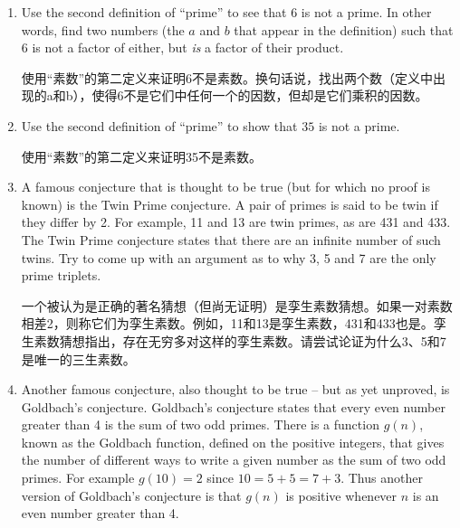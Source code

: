 \begin{enumerate}
  \item Use the second definition of ``prime'' to see that $6$ is
  not a prime.
  In other words, find two numbers (the $a$ and $b$ 
  that appear in the definition) such that $6$ is not a factor of
  either, but {\em is} a factor of their product.
  
  使用“素数”的第二定义来证明6不是素数。换句话说，找出两个数（定义中出现的a和b），使得6不是它们中任何一个的因数，但却是它们乘积的因数。
  \wbvfill
  
  
  \item Use the second definition of ``prime'' to show that $35$ is
  not a prime.
  
  使用“素数”的第二定义来证明35不是素数。
  \wbvfill
  
  
  \workbookpagebreak
  
  \item A famous conjecture that is thought to be true (but
  for which no proof is known) is the  
  Twin Prime conjecture.
  A pair of primes is said to be twin if they differ by 2.
  For example, 11 and 13 are twin primes, as are 431 and 433.
  The Twin Prime conjecture states that there are an infinite
  number of such twins.
  Try to come up with an argument as
  to why 3, 5 and 7 are the only prime triplets.
  
  一个被认为是正确的著名猜想（但尚无证明）是孪生素数猜想。如果一对素数相差2，则称它们为孪生素数。例如，11和13是孪生素数，431和433也是。孪生素数猜想指出，存在无穷多对这样的孪生素数。请尝试论证为什么3、5和7是唯一的三生素数。
  \wbvfill
  
  
  
  
  \item Another famous conjecture, also thought to be true -- but
  as yet unproved, is 
  Goldbach's conjecture.
  Goldbach's conjecture
  states that every even number greater than 4 is the sum of two odd
  primes.
  There is a function $g(n)$, known as the Goldbach function, defined
  on the positive integers, that gives the number of different ways to 
  write a given number as the sum of two odd primes.
  For example $g(10) = 2$
  since $10=5+5=7+3$.  Thus another version of Goldbach's conjecture
  is that $g(n)$ is positive whenever $n$ is an even number greater than
  4.
  

\end{enumerate}
